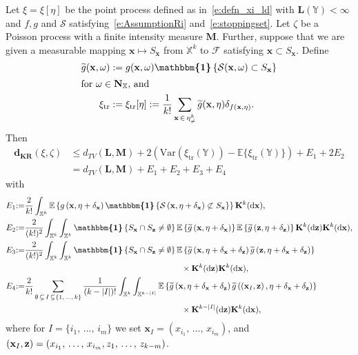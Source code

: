 \documentclass[AHL,Unicode,longabstracts]{cedram}
\newcommand*\bL{\mathbf{L}}
\newcommand*\bM{\mathbf{M}}
\newcommand*\bN{\mathbf{N}}
\newcommand*\bK{\mathbf{K}}
\newcommand{\bz}{\mathbf{z}}
\newcommand{\bx}{\mathbf{x}}
\newcommand*\dkr{\mathbf{d_{KR}}}
\newcommand*\X{\mathbb{X}}
\newcommand*\Y{\mathbb{Y}}
\newcommand{\E}{\mathbb{E}}
\newcommand*\cF{\mathcal{F}}
\newcommand*\cS{\mathcal{S}}
\newcommand{\tr}{\mathrm{tr}}
\newcommand*\md{\mathrm{d}}
\newcommand{\mean}[1] {\E\left\{{#1}\right\}}
\newcommand{\meanx}[1] {\E\{{#1}\}}
\newcommand{\ind}{\boldsymbol{\mathbbm{1}}}
\newcommand{\varx}[1]{\mathrm{Var}({#1})}
\newcommand{\set}[1]{\left\{#1\right\}}
\newcommand{\param}[1]{\left(#1\right)}
\newcommand{\tg}{\tilde{g}}
\let\oldtilde\tilde
\renewcommand*{\tilde}[1]{\mathchoice{\widetilde{#1}}{\widetilde{#1}}{\oldtilde{#1}}{\oldtilde{#1}}}
\begin{document}
\begin{theo}\label{t:qldep}
Let $\xi = \xi[\eta]$ be the point process defined as in~\eqref{e:defn_xi_ld} with $\bL(\Y)<\infty$ and $f,g$ and $\cS$ satisfying~\eqref{e:AssumptionRi} and~\eqref{e:stoppingset}. Let $\zeta$ be a Poisson process with {a finite} intensity measure $\bM$. Further, suppose that we are given a measurable mapping $\bx \mapsto S_{\bx}$ from $\X^k$ to $\cF$ satisfying {$\bx \subset S_{\bx}$.} Define
\begin{align*}
\tg(\bx,\omega) :=&\; g(\bx,\omega)\ind\set{\cS(\bx,\omega) \subset S_{\bx}}
\\
\intertext{for $\omega \in \bN_{\X}$, and}
\xi_{\tr} :=&\;\xi_{\tr}[\eta] := \frac{1}{k!}\sum_{\bx\, \in\,\eta^k_{\ne}}\tilde g(\bx,\eta)\delta_{f(\bx,\eta)}.
\end{align*}
Then
\begin{align*}
\dkr(\xi,\zeta) &\le d_{TV}(\bL,\bM) + 2\param{\varx{\xi_{\tr}(\Y)} - \meanx{\xi_{\tr}(\Y)} } + E_1 + 2E_2\\
&= d_{TV}(\bL,\bM) + E_1 + E_2 + E_3 + E_4
\end{align*}
with
\begin{align*}
E_1 & {:=} \frac{2}{k!} \int_{\X^k} \mean{g\left(\bx,\eta+\delta_{\bx}\right) \ind\set{\cS\left(\bx,\eta+\delta_{\bx}\right)\not\subset S_{\bx}}} \bK^k(\md\bx), \allowdisplaybreaks \\
E_2 & {:=} \frac{2}{(k!)^2} \int_{\X^{k}} \int_{\X^{k}} \ind\set{S_{\bx}\cap S_{\bz}\ne \emptyset} \mean{\tg\left(\bx,\eta+\delta_{\bx}\right)} \mean{\tg\left(\bz,\eta+\delta_{\bz}\right)} \bK^k(\md \bz)\bK^k(\md \bx), \allowdisplaybreaks \\
E_3 & {:=} \frac{2}{(k!)^2} \int_{\X^{k}} \int_{\X^{k}} \ind\set{S_{\bx}\cap S_{\bz}\ne \emptyset} \mean{\tg\left(\bx,\eta+\delta_{\bx}+\delta_{\bz}\right)\tg\left(\bz,\eta+\delta_{\bx}+\delta_{\bz}\right)}\\
&\hspace{7cm}\times\bK^k(\md\bz)\bK^k(\md\bx), \allowdisplaybreaks \\
E_4 & {:=} \frac{2}{k!}\sum_{\emptyset\,\subsetneq\,I\,\subsetneq {\{1,\,\hdots,\,k\}}} \frac{1}{(k-|I|)!} \int_{\X^k}\int_{\X^{k-|I|}}\mean{ \tg\left(\bx, \eta+\delta_{\bx}+\delta_{\bz}\right) \tg\left(\left(\bx_{I},\bz\right),\eta+\delta_{\bx}+\delta_{\bz}\right)} \\
& \hspace{7cm} \times \bK^{k-|I|}(\md\bz) \bK^k(\md\bx),
\end{align*}
where for $I = \{i_1,\,\ldots,\,i_m\}$ we set $\bx_I = (x_{i_1},\,\ldots,\,x_{i_m})$, and $(\bx_I,\bz) = (x_{i_1},\,\ldots,\,x_{i_m},\linebreak z_1,\,\ldots,\, z_{k-m})$.
\end{theo} 
\end{document}
